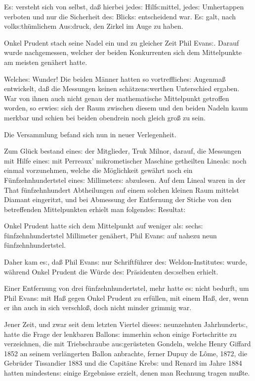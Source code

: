 \documentclass[oneside,12pt]{book}
\newcommand{\s}{s:}
\begin{document}
E{\s} versteht sich von selbst, da{\ss} hierbei jede{\s} Hilf{\s}mittel,
jede{\s} Umhertappen verboten und nur die Sicherheit de{\s} Blick{\s}
entscheidend war. E{\s} galt, nach volk{\s}th\"umlichem Au{\s}druck,
den Zirkel im Auge zu haben.

Onkel Prudent stach seine Nadel ein und zu gleicher Zeit Phil
Evan{\s}. Darauf wurde nachgemessen, welcher der beiden Konkurrenten
sich dem Mittelpunkte am meisten gen\"ahert hatte.

Welche{\s} Wunder! Die beiden M\"anner hatten so vortreffliche{\s}
Augenma{\ss} entwickelt, da{\ss} die Messungen keinen
sch\"atzen{\s}werthen Unterschied ergaben. War von ihnen auch nicht
genau der mathematische Mittelpunkt getroffen worden, so erwie{\s}
sich der Raum zwischen diesem und den beiden Nadeln kaum merkbar und
schien bei beiden obendrein noch gleich gro{\ss} zu sein.

Die Versammlung befand sich nun in neuer Verlegenheit.

Zum Gl\"uck bestand eine{\s} der Mitglieder, Truk Milnor, darauf, die
Messungen mit Hilfe eine{\s} mit Perreaux' mikrometischer Maschine
getheilten Lineal{\s} noch einmal vorzunehmen, welche die
M\"oglichkeit gew\"ahrt noch ein F\"unfzehnhundertstel eine{\s}
Millimeter{\s} abzulesen. Auf dem Lineal waren in der That
f\"unfzehnhundert Abtheilungen auf einem solchen kleinen Raum
mittelst Diamant eingeritzt, und bei Abmessung der Entfernung der
Stiche von den betreffenden Mittelpunkten erhielt man folgende{\s}
Resultat:

Onkel Prudent hatte sich dem Mittelpunkt auf weniger al{\s} sech{\s}
f\"unfzehnhundertstel Millimeter gen\"ahert, Phil Evan{\s} auf nahezu
neun f\"unfzehnhundertstel.

Daher kam e{\s}, da{\ss} Phil Evan{\s} nur Schriftf\"uhrer de{\s}
Weldon-Institute{\s} wurde, w\"ahrend Onkel Prudent die W\"urde
de{\s} Pr\"asidenten de{\s}selben erhielt.

Einer Entfernung von drei f\"unfzehnhundertstel, mehr hatte e{\s}
nicht bedurft, um Phil Evan{\s} mit Ha{\ss} gegen Onkel Prudent zu
erf\"ullen, mit einem Ha{\ss}, der, wenn er ihn auch in sich
verschlo{\ss}, doch nicht minder grimmig war.

Jener Zeit, und zwar seit dem letzten Viertel diese{\s} neunzehnten
Jahrhundert{\s}, hatte die Frage der lenkbaren Ballon{\s} immerhin
schon einige Fortschritte zu verzeichnen, die mit Triebschraube
au{\s}ger\"usteten Gondeln, welche Henry Giffard 1852 an seinem
verl\"angerten Ballon anbrachte, ferner Dupuy de L\^ome, 1872, die
Gebr\"uder Tissandier 1883 und die Capit\"ane Kreb{\s} und Renard im
Jahre 1884 hatten mindesten{\s} einige Ergebnisse erzielt, denen man
Rechnung tragen mu{\ss}te.
\end{document}
